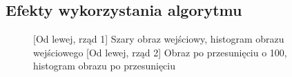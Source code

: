 \documentclass[a4paper,12pt, titlepage]{report}
\begin{document}
\subsection*{Efekty wykorzystania algorytmu}
\begin{figure}[h]
    \centering
    \qquad
    \caption{[Od lewej, rząd 1] Szary obraz wejściowy, histogram obrazu wejściowego [Od lewej, rząd 2] Obraz po przesunięciu o 100, histogram obrazu po przesunięciu}%
    \label{fig:rysunek}%
\end{figure}
\end{document}
